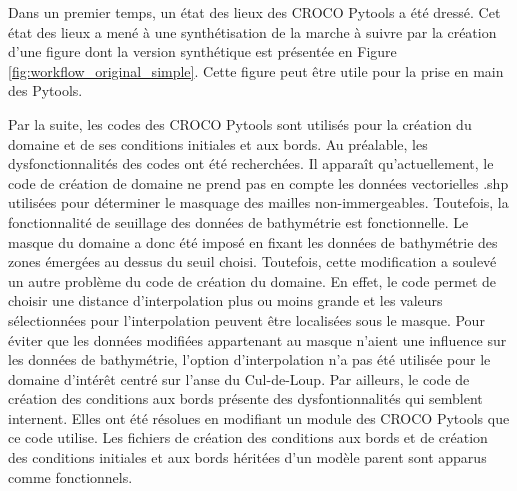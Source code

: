 \documentclass[10pt,a4paper,titlepage]{article}
\begin{document}
Dans un premier temps, un état des lieux des CROCO Pytools a été dressé.
Cet état des lieux a mené à une synthétisation de la marche à suivre par la création d'une figure dont la version synthétique est présentée en Figure \ref{fig:workflow_original_simple}.
Cette figure peut être utile pour la prise en main des Pytools.

Par la suite, les codes des CROCO Pytools sont utilisés pour la création du domaine et de ses conditions initiales et aux bords.
Au préalable, les dysfonctionnalités des codes ont été recherchées.
Il apparaît qu'actuellement, le code de création de domaine ne prend pas en compte les données vectorielles .shp utilisées pour déterminer le masquage des mailles non-immergeables.
Toutefois, la fonctionnalité de seuillage des données de bathymétrie est fonctionnelle.
Le masque du domaine a donc été imposé en fixant les données de bathymétrie des zones émergées au dessus du seuil choisi.
Toutefois, cette modification a soulevé un autre problème du code de création du domaine.
En effet, le code permet de choisir une distance d'interpolation plus ou moins grande et les valeurs sélectionnées pour l'interpolation peuvent être localisées sous le masque.
Pour éviter que les données modifiées appartenant au masque n'aient une influence sur les données de bathymétrie, l'option d'interpolation n'a pas été utilisée pour le domaine d'intérêt centré sur l'anse du Cul-de-Loup.
Par ailleurs, le code de création des conditions aux bords présente des dysfontionnalités qui semblent internent.
Elles ont été résolues en modifiant un module des CROCO Pytools que ce code utilise.
Les fichiers de création des conditions aux bords et de création des conditions initiales et aux bords héritées d'un modèle parent sont apparus comme fonctionnels.
\end{document}
